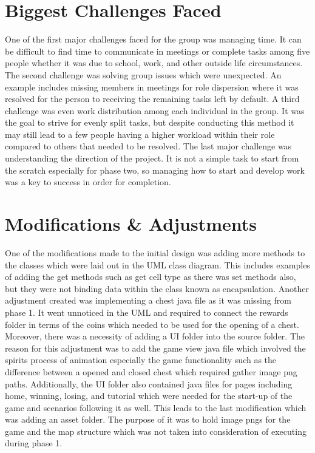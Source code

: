 \documentclass[12pt,letterpaper]{article}
\begin{document}
\section{Biggest Challenges Faced}
One of the first major challenges faced for the group was managing time. It can be difficult to find time to communicate in meetings or complete tasks among five people whether it was due to school, work, and other outside life circumstances. The second challenge was solving group issues which were unexpected. An example includes missing members in meetings for role dispersion where it was resolved for the person to receiving the remaining tasks left by default. A third challenge was even work distribution among each individual in the group. It was the goal to strive for evenly split tasks, but despite conducting this method it may still lead to a few people having a higher workload within their role compared to others that needed to be resolved. The last major challenge was understanding the direction of the project. It is not a simple task to start from the scratch especially for phase two, so managing how to start and develop work was a key to success in order for completion.

\section{Modifications \& Adjustments}
One of the modifications made to the initial design was adding more methods to the classes which were laid out in the UML class diagram. This includes examples of adding the get methods such as get cell type as there was set methods also, but they were not binding data within the class known as encapsulation. Another adjustment created was implementing a chest java file as it was missing from phase 1. It went unnoticed in the UML and required to connect the rewards folder in terms of the coins which needed to be used for the opening of a chest. Moreover, there was a necessity of adding a UI folder into the source folder. The reason for this adjustment was to add the game view java file which involved the spirits process of animation especially the game functionality such as the difference between a opened and closed chest which required gather image png paths. Additionally, the UI folder also contained java files for pages including home, winning, losing, and tutorial which were needed for the start-up of the game and scenarios following it as well. This leads to the last modification which was adding an asset folder. The purpose of it was to hold image pngs for the game and the map structure which was not taken into consideration of executing during phase 1.
\end{document}
